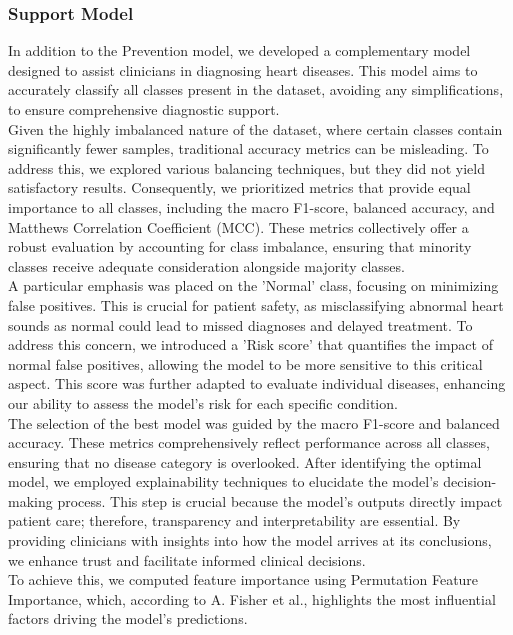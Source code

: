 \subsubsection*{Support Model}
In addition to the Prevention model, we developed a complementary model designed to assist clinicians in diagnosing heart diseases.
This model aims to accurately classify all classes present in the dataset, avoiding any simplifications, to ensure comprehensive diagnostic support.\\
Given the highly imbalanced nature of the dataset, where certain classes contain significantly fewer samples, traditional accuracy metrics can be misleading.
To address this, we explored various balancing techniques, but they did not yield satisfactory results.
Consequently, we prioritized metrics that provide equal importance to all classes, including the macro F1-score, balanced accuracy,
and Matthews Correlation Coefficient (MCC). These metrics collectively offer a robust evaluation by accounting for class imbalance,
ensuring that minority classes receive adequate consideration alongside majority classes.\\
A particular emphasis was placed on the 'Normal' class, focusing on minimizing false positives. This is crucial for patient safety,
as misclassifying abnormal heart sounds as normal could lead to missed diagnoses and delayed treatment.
To address this concern, we introduced a 'Risk score' that quantifies the impact of normal false positives, allowing
the model to be more sensitive to this critical aspect. This score was further adapted to evaluate individual diseases,
enhancing our ability to assess the model's risk for each specific condition.\\
The selection of the best model was guided by the macro F1-score and balanced accuracy.
These metrics comprehensively reflect performance across all classes, ensuring that no disease category is overlooked.
After identifying the optimal model, we employed explainability techniques to elucidate the model’s decision-making process.
This step is crucial because the model's outputs directly impact patient care; therefore, transparency and interpretability are essential.
By providing clinicians with insights into how the model arrives at its conclusions, we enhance trust and facilitate informed clinical decisions.\\
To achieve this, we computed feature importance using Permutation Feature Importance, which, according to A. Fisher et al.\cite{fisher2019modelswrongusefullearning},
highlights the most influential factors driving the model's predictions.\\

